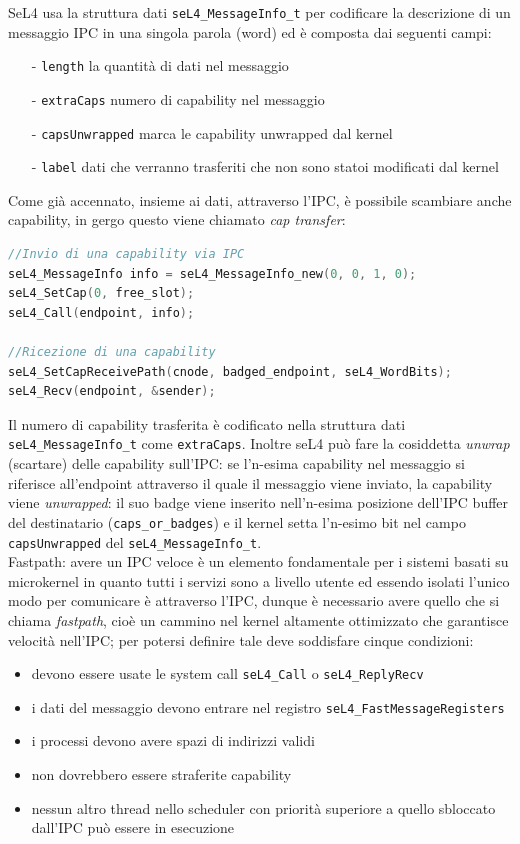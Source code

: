 SeL4 usa la struttura dati \texttt{seL4\_MessageInfo\_t} per codificare la descrizione di un messaggio IPC in una singola parola (word) ed è composta dai seguenti campi:
\begin{itemize}
	\item[-] \texttt{length} la quantità di dati nel messaggio
	\item[-] \texttt{extraCaps} numero di capability nel messaggio 
	\item[-] \texttt{capsUnwrapped} marca le capability unwrapped dal kernel
	\item[-] \texttt{label} dati che verranno trasferiti che non sono statoi modificati dal kernel
\end{itemize}
Come già accennato, insieme ai dati, attraverso l'IPC, è possibile scambiare anche capability, in gergo questo viene chiamato \textit{cap transfer}:
\begin{lstlisting}[language=C++]
//Invio di una capability via IPC
seL4_MessageInfo info = seL4_MessageInfo_new(0, 0, 1, 0);
seL4_SetCap(0, free_slot);
seL4_Call(endpoint, info);

//Ricezione di una capability
seL4_SetCapReceivePath(cnode, badged_endpoint, seL4_WordBits);
seL4_Recv(endpoint, &sender);
\end{lstlisting}
Il numero di capability trasferita è codificato nella struttura dati \texttt{seL4\_MessageInfo\_t} come \texttt{extraCaps}.
Inoltre seL4 può fare la cosiddetta \textit{unwrap} (scartare) delle capability sull'IPC: se l'n-esima capability nel messaggio si riferisce all'endpoint attraverso il quale il messaggio viene inviato, la capability viene \textit{unwrapped}: il suo badge viene inserito nell'n-esima posizione dell'IPC buffer del destinatario (\texttt{caps\_or\_badges}) e il kernel setta l'n-esimo bit nel campo \texttt{capsUnwrapped} del \texttt{seL4\_MessageInfo\_t}.\\
Fastpath: avere un IPC veloce è un elemento fondamentale per i sistemi basati su microkernel in quanto tutti i servizi sono a livello utente ed essendo isolati l'unico modo per comunicare è attraverso l'IPC, dunque è necessario avere quello che si chiama \textit{fastpath}, cioè un cammino nel kernel altamente ottimizzato che garantisce velocità nell'IPC; per potersi definire tale deve soddisfare cinque condizioni:
\begin{itemize}
	\item devono essere usate le system call \texttt{seL4\_Call} o \texttt{seL4\_ReplyRecv}
	\item i dati del messaggio devono entrare nel registro \texttt{seL4\_FastMessageRegisters}
	\item i processi devono avere spazi di indirizzi validi
	\item non dovrebbero essere straferite capability 
	\item nessun altro thread nello scheduler con priorità superiore a quello sbloccato dall'IPC può essere in esecuzione
\end{itemize}

